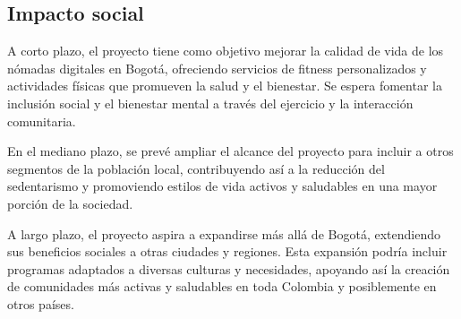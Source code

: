 
\color{red}
\subsection{Impacto social}

A corto plazo, el proyecto tiene como objetivo mejorar la calidad de vida de los nómadas digitales en Bogotá, ofreciendo servicios de fitness personalizados y actividades físicas que promueven la salud y el bienestar. Se espera fomentar la inclusión social y el bienestar mental a través del ejercicio y la interacción comunitaria.

En el mediano plazo, se prevé ampliar el alcance del proyecto para incluir a otros segmentos de la población local, contribuyendo así a la reducción del sedentarismo y promoviendo estilos de vida activos y saludables en una mayor porción de la sociedad.

A largo plazo, el proyecto aspira a expandirse más allá de Bogotá, extendiendo sus beneficios sociales a otras ciudades y regiones. Esta expansión podría incluir programas adaptados a diversas culturas y necesidades, apoyando así la creación de comunidades más activas y saludables en toda Colombia y posiblemente en otros países.